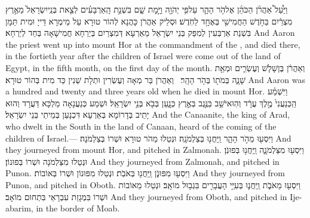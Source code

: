 {וַיַּ֩עַל֩ אַהֲרֹ֨ן הַכֹּהֵ֜ן אֶל\maqqaf הֹ֥ר הָהָ֛ר עַל\maqqaf פִּ֥י יְהֹוָ֖ה וַיָּ֣מׇת שָׁ֑ם בִּשְׁנַ֣ת הָֽאַרְבָּעִ֗ים לְצֵ֤את בְּנֵֽי\maqqaf יִשְׂרָאֵל֙ מֵאֶ֣רֶץ מִצְרַ֔יִם בַּחֹ֥דֶשׁ הַחֲמִישִׁ֖י בְּאֶחָ֥ד לַחֹֽדֶשׁ׃}
{וּסְלֵיק אַהֲרֹן כָּהֲנָא לְהוֹר טוּרָא עַל מֵימְרָא דַּייָ וּמִית תַּמָּן בִּשְׁנַת אַרְבְּעִין לְמִפַּק בְּנֵי יִשְׂרָאֵל מֵאַרְעָא דְּמִצְרַיִם בְּיַרְחָא חֲמִישָׁאָה בְּחַד לְיַרְחָא׃}
{And Aaron the priest went up into mount Hor at the commandment of the \lord, and died there, in the fortieth year after the children of Israel were come out of the land of Egypt, in the fifth month, on the first day of the month.}{}
{וְאַהֲרֹ֔ן בֶּן\maqqaf שָׁלֹ֧שׁ וְעֶשְׂרִ֛ים וּמְאַ֖ת שָׁנָ֑ה בְּמֹת֖וֹ בְּהֹ֥ר הָהָֽר׃ \setuma }
{וְאַהֲרֹן בַּר מְאָה וְעֶשְׂרִין וּתְלָת שְׁנִין כַּד מִית בְּהוֹר טוּרָא׃}
{And Aaron was a hundred and twenty and three years old when he died in mount Hor.}{}
{וַיִּשְׁמַ֗ע הַֽכְּנַעֲנִי֙ מֶ֣לֶךְ עֲרָ֔ד וְהֽוּא\maqqaf יֹשֵׁ֥ב בַּנֶּ֖גֶב בְּאֶ֣רֶץ כְּנָ֑עַן בְּבֹ֖א בְּנֵ֥י יִשְׂרָאֵֽל׃}
{וּשְׁמַע כְּנַעֲנָאָה מַלְכָּא דַּעֲרָד וְהוּא יָתֵיב בְּדָרוֹמָא בְּאַרְעָא דִּכְנָעַן בְּמֵיתֵי בְּנֵי יִשְׂרָאֵל׃}
{And the Canaanite, the king of Arad, who dwelt in the South in the land of Canaan, heard of the coming of the children of Israel.—}{}
{וַיִּסְע֖וּ מֵהֹ֣ר הָהָ֑ר וַֽיַּחֲנ֖וּ בְּצַלְמֹנָֽה׃}
{וּנְטַלוּ מֵהֹר טוּרָא וּשְׁרוֹ בְּצַלְמֹנָה׃}
{And they journeyed from mount Hor, and pitched in Zalmonah.}{}
{וַיִּסְע֖וּ מִצַּלְמֹנָ֑ה וַֽיַּחֲנ֖וּ בְּפוּנֹֽן׃}
{וּנְטַלוּ מִצַּלְמֹנָה וּשְׁרוֹ בְּפוּנוֹן׃}
{And they journeyed from Zalmonah, and pitched in Punon.}{}
{וַיִּסְע֖וּ מִפּוּנֹ֑ן וַֽיַּחֲנ֖וּ בְּאֹבֹֽת׃}
{וּנְטַלוּ מִפּוּנוֹן וּשְׁרוֹ בְּאוֹבוֹת׃}
{And they journeyed from Punon, and pitched in Oboth.}{}
{וַיִּסְע֖וּ מֵאֹבֹ֑ת וַֽיַּחֲנ֛וּ בְּעִיֵּ֥י הָעֲבָרִ֖ים בִּגְב֥וּל מוֹאָֽב׃}
{וּנְטַלוּ מֵאוֹבוֹת וּשְׁרוֹ בִּמְגָזַת עִבְרָאֵי בִּתְחוּם מוֹאָב׃}
{And they journeyed from Oboth, and pitched in Ije-abarim, in the border of Moab.}{}
